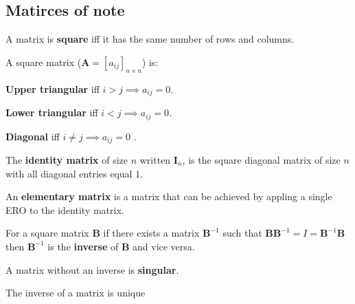 \begin{definition}
    
\end{definition}

\begin{definition}
    
\end{definition}

\subsection{Matirces of note}

\begin{definition}
    A matrix is \textbf{square} iff it has the same number of rows and columns.
\end{definition}

\begin{definition}
    A square matrix ($\textbf{A} = [a_{ij}]_{n\times n}$) is: \begin{enumerate*}
        \item \textbf{Upper triangular} iff $i>j \implies a_{ij}=0$.
        \item \textbf{Lower triangular} iff $i<j \implies a_{ij}=0$.
        \item \textbf{Diagonal} iff $i\neq j \implies a_{ij}=0$ .
    \end{enumerate*}
\end{definition}

\begin{definition}
    The \textbf{identity matrix} of size $n$ written $\textbf{I}_{n}$, is the square diagonal matrix of size $n$ with all diagonal entries equal $1$.
\end{definition}

\begin{definition}
    An \textbf{elementary matrix} is a matrix that can be achieved by appling a single ERO to the identity matrix.
\end{definition}

\begin{definition}[Inverse]
    For a square matrix $\textbf{B}$ if there exists a matrix $\textbf{B}^{-1}$ such that $\textbf{BB}^{-1} = I = \textbf{B}^{-1}\textbf{B}$ then $\textbf{B}^{-1}$ is the \textbf{inverse} of $\textbf{B}$ and vice versa.
\end{definition}

\begin{definition}[Singular]
    A matrix without an inverse is \textbf{singular}.
\end{definition}

\begin{theorem}
    The inverse of a matrix is unique
\end{theorem}

